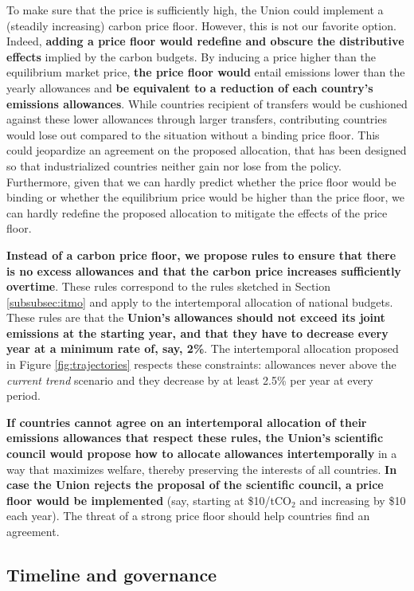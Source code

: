 \documentclass[12pt,english]{article}
\begin{document}
To make sure that the price is sufficiently high, the Union could implement a (steadily increasing) carbon price floor. However, this is not our favorite option. Indeed, \textbf{adding a price floor would redefine and obscure the distributive effects} implied by the carbon budgets. By inducing a price higher than the equilibrium market price, \textbf{the price floor would} entail emissions lower than the yearly allowances and \textbf{be equivalent to a reduction of each country's emissions allowances}. While countries recipient of transfers would be cushioned against these lower allowances through larger transfers, contributing countries would lose out compared to the situation without a binding price floor. This could jeopardize an agreement on the proposed allocation, that has been designed so that industrialized countries neither gain nor lose from the policy. Furthermore, given that we can hardly predict whether the price floor would be binding or whether the equilibrium price would be higher than the price floor, we can hardly redefine the proposed allocation to mitigate the effects of the price floor.

\textbf{Instead of a carbon price floor, we propose rules to ensure that there is no excess allowances and that the carbon price increases sufficiently overtime}. These rules correspond to the rules sketched in Section \ref{subsubsec:itmo} and apply to the intertemporal allocation of national budgets. These rules are that the \textbf{Union's allowances should not exceed its joint emissions at the starting year, and that they have to decrease every year at a minimum rate of, say, 2\%}. The intertemporal allocation proposed in Figure \ref{fig:trajectories} respects these constraints: allowances never above the \textit{current trend} scenario and they decrease by at least 2.5\% per year at every period.

\textbf{If countries cannot agree on an intertemporal allocation of their emissions allowances that respect these rules, the Union's scientific council would propose how to allocate allowances intertemporally} in a way that maximizes welfare, thereby preserving the interests of all countries. \textbf{In case the Union rejects the proposal of the scientific council, a price floor would be implemented} (say, starting at \$10/tCO$_\text{2}$ and increasing by \$10 each year). The threat of a strong price floor should help countries find an agreement.

\subsection{Timeline and governance\label{subsec:implementation}}
\end{document}
